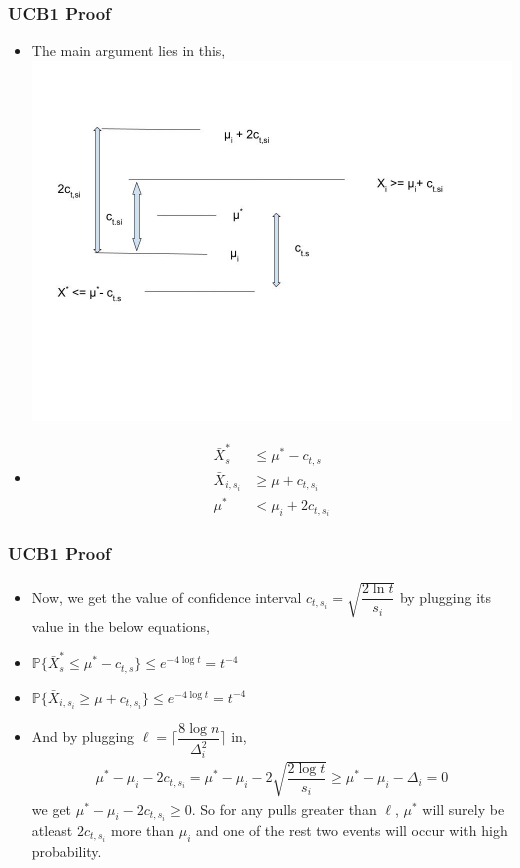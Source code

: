 \begin{frame}
\frametitle{UCB1 Proof}
\begin{itemize}
\item<1-> The main argument lies in this, 
\includegraphics[scale=0.19]{img/UCB1_pic} 
\item<1-> \begin{align*}
\bar{X}^{*}_{s}&\leq \mu^* - c_{t,s}\\
\bar{X}_{i,s_i}&\geq \mu + c_{t,s_i}\\
\mu^* & < \mu_i + 2c_{t,s_i}
\end{align*}
\end{itemize}
\end{frame}

\begin{frame}
\frametitle{UCB1 Proof}
\begin{itemize}
\item<0-> Now, we get the value of confidence interval $c_{t,s_i}=\sqrt{\dfrac{2\ln t}{s_i}}$ by plugging its value in the below equations,
\item<1-> $\mathbb{P}\lbrace  \bar{X}^{*}_{s}\leq \mu^* - c_{t,s}\rbrace \leq e^{-4\log t} = t^{-4}$
\item<2-> $\mathbb{P}\lbrace \bar{X}_{i,s_i} \geq \mu + c_{t,s_i}\rbrace \leq e^{-4\log t} = t^{-4}$
\item<3-> And by plugging $\ell=\bigg\lceil \dfrac{8\log n}{\Delta_{i}^{2}}\bigg\rceil$ in,
\begin{align*}
\mu^* - \mu_i - 2c_{t,s_i} = \mu^* - \mu_i - 2\sqrt{\dfrac{2\log t}{s_i}} \geq \mu^* - \mu_i -\Delta_i =0
\end{align*} 
we get $\mu^* - \mu_i - 2c_{t,s_i} \geq 0$. So for any pulls greater than $\ell$, $\mu^*$ will surely be atleast $2c_{t,s_i}$  more than $\mu_i$ and one of the rest two events will occur with high probability.
\end{itemize}
\end{frame}

